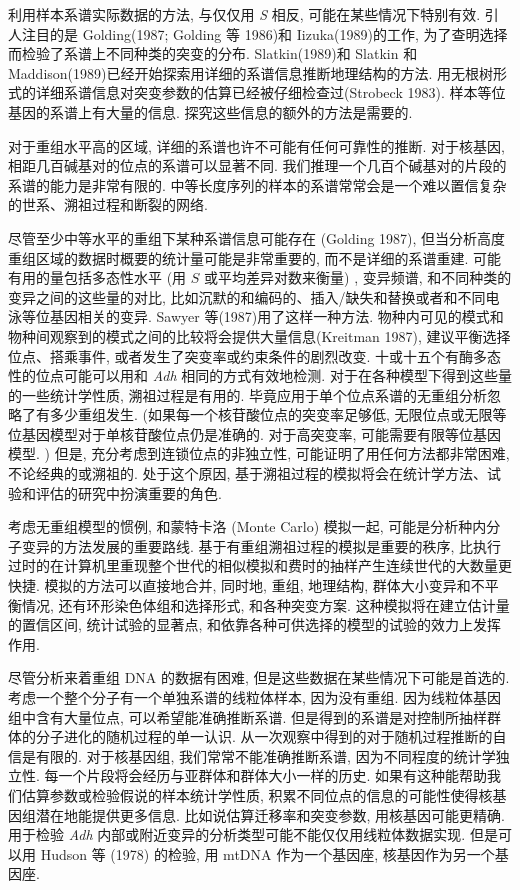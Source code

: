 \documentclass[12pt]{article}
\begin{document}
利用样本系谱实际数据的方法, 与仅仅用 \textit{S} 相反, 可能在某些情况下特别有效. 引人注目的是 Golding(1987; Golding 等
1986)和 Iizuka(1989)的工作, 为了查明选择而检验了系谱上不同种类的突变的分布. Slatkin(1989)和 Slatkin 和
Maddison(1989)已经开始探索用详细的系谱信息推断地理结构的方法.
用无根树形式的详细系谱信息对突变参数的估算已经被仔细检查过(Strobeck 1983). 样本等位基因的系谱上有大量的信息.
探究这些信息的额外的方法是需要的.

对于重组水平高的区域, 详细的系谱也许不可能有任何可靠性的推断. 对于核基因, 相距几百碱基对的位点的系谱可以显著不同.
我们推理一个几百个碱基对的片段的系谱的能力是非常有限的.
中等长度序列的样本的系谱常常会是一个难以置信复杂的世系、溯祖过程和断裂的网络.

尽管至少中等水平的重组下某种系谱信息可能存在 (Golding 1987), 但当分析高度重组区域的数据时概要的统计量可能是非常重要的,
而不是详细的系谱重建. 可能有用的量包括多态性水平 (用 $S$ 或平均差异对数来衡量) , 变异频谱,
和不同种类的变异之间的这些量的对比, 比如沉默的和编码的、插入/缺失和替换或者和不同电泳等位基因相关的变异. Sawyer
等(1987)用了这样一种方法. 物种内可见的模式和物种间观察到的模式之间的比较将会提供大量信息(Kreitman 1987),
建议平衡选择位点、搭乘事件, 或者发生了突变率或约束条件的剧烈改变.
十或十五个有酶多态性的位点可能可以用和 \textit{Adh} 相同的方式有效地检测. 对于在各种模型下得到这些量的一些统计学性质,
溯祖过程是有用的. 毕竟应用于单个位点系谱的无重组分析忽略了有多少重组发生. (如果每一个核苷酸位点的突变率足够低,
无限位点或无限等位基因模型对于单核苷酸位点仍是准确的. 对于高突变率, 可能需要有限等位基因模型. ) 但是,
充分考虑到连锁位点的非独立性, 可能证明了用任何方法都非常困难, 不论经典的或溯祖的. 处于这个原因,
基于溯祖过程的模拟将会在统计学方法、试验和评估的研究中扮演重要的角色.

考虑无重组模型的惯例, 和蒙特卡洛 (Monte Carlo) 模拟一起, 可能是分析种内分子变异的方法发展的重要路线.
基于有重组溯祖过程的模拟是重要的秩序, 比执行过时的在计算机里重现整个世代的相似模拟和费时的抽样产生连续世代的大数量更快捷.
模拟的方法可以直接地合并, 同时地, 重组, 地理结构, 群体大小变异和不平衡情况, 还有环形染色体组和选择形式, 和各种突变方案.
这种模拟将在建立估计量的置信区间, 统计试验的显著点, 和依靠各种可供选择的模型的试验的效力上发挥作用.

尽管分析来着重组 DNA 的数据有困难, 但是这些数据在某些情况下可能是首选的. 考虑一个整个分子有一个单独系谱的线粒体样本,
因为没有重组. 因为线粒体基因组中含有大量位点, 可以希望能准确推断系谱.
但是得到的系谱是对控制所抽样群体的分子进化的随机过程的单一认识. 从一次观察中得到的对于随机过程推断的自信是有限的.
对于核基因组, 我们常常不能准确推断系谱, 因为不同程度的统计学独立性. 每一个片段将会经历与亚群体和群体大小一样的历史.
如果有这种能帮助我们估算参数或检验假说的样本统计学性质, 积累不同位点的信息的可能性使得核基因组潜在地能提供更多信息.
比如说估算迁移率和突变参数, 用核基因可能更精确.
用于检验 \textit{Adh} 内部或附近变异的分析类型可能不能仅仅用线粒体数据实现. 但是可以用 Hudson 等 (1978) 的检验, 用
mtDNA 作为一个基因座, 核基因作为另一个基因座.
\end{document}
